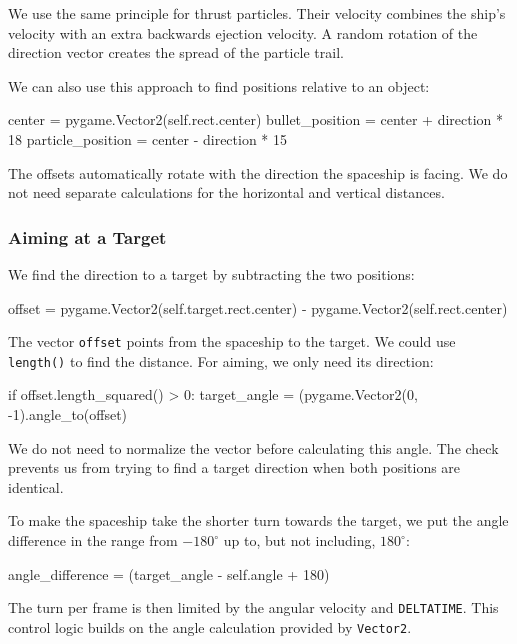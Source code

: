 We use the same principle for thrust particles. Their velocity combines the ship's velocity with an extra backwards ejection velocity. A random rotation of the direction vector creates the spread of the particle trail.

We can also use this approach to find positions relative to an object:
\begin{codebox}
center = pygame.Vector2(self.rect.center)
bullet_position = center + direction * 18
particle_position = center - direction * 15
\end{codebox}

The offsets automatically rotate with the direction the spaceship is facing. We do not need separate calculations for the horizontal and vertical distances.

\newpage
\subsubsection*{Aiming at a Target}

We find the direction to a target by subtracting the two positions:
\begin{codebox}
offset = pygame.Vector2(self.target.rect.center) - pygame.Vector2(self.rect.center)
\end{codebox}

The vector \texttt{offset} points from the spaceship to the target. We could use \texttt{length()} to find the distance. For aiming, we only need its direction:
\begin{codebox}
if offset.length_squared() > 0:
    target_angle = (pygame.Vector2(0, -1).angle_to(offset) %
\end{codebox}

We do not need to normalize the vector before calculating this angle. The check prevents us from trying to find a target direction when both positions are identical.

To make the spaceship take the shorter turn towards the target, we put the angle difference in the range from $-180^\circ$ up to, but not including, $180^\circ$:

\begin{codebox}
	angle_difference = (target_angle - self.angle + 180) %
\end{codebox}

The turn per frame is then limited by the angular velocity and \texttt{DELTATIME}. This control logic builds on the angle calculation provided by \texttt{Vector2}.

